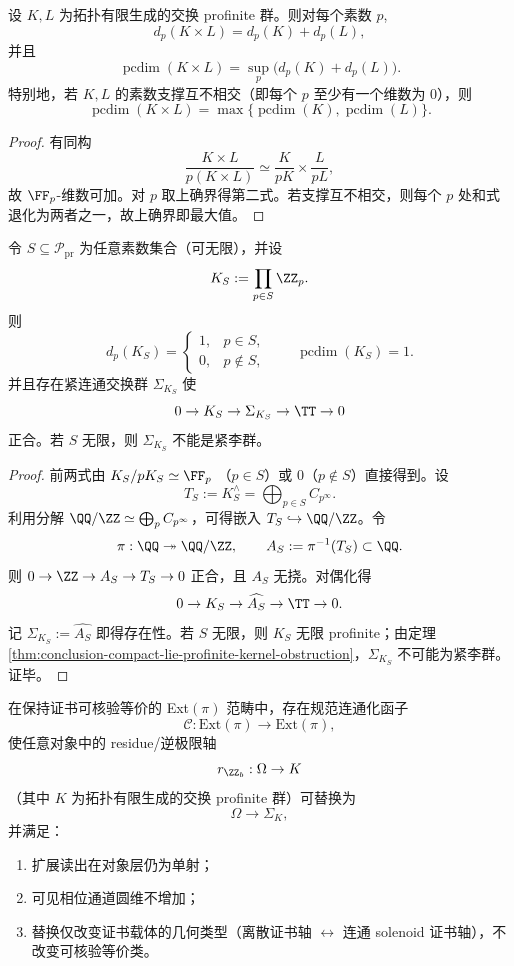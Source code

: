 \begin{proposition}[素数并行的最大值法则与非加性]\label{prop:conclusion-pcdim-max-law}
设 \(K,L\) 为拓扑有限生成的交换 profinite 群。则对每个素数 \(p\),
\[
d_p(K\times L)=d_p(K)+d_p(L),
\]
并且
\[
\operatorname{pcdim}(K\times L)
=
\sup_p\bigl(d_p(K)+d_p(L)\bigr).
\]
特别地，若 \(K,L\) 的素数支撑互不相交（即每个 \(p\) 至少有一个维数为 \(0\)），则
\[
\operatorname{pcdim}(K\times L)=
\max\{\operatorname{pcdim}(K),\operatorname{pcdim}(L)\}.
\]
\end{proposition}
\begin{proof}
有同构
\[
\frac{K\times L}{p(K\times L)}
\simeq
\frac{K}{pK}\times \frac{L}{pL},
\]
故 \(\FF_p\)-维数可加。对 \(p\) 取上确界得第二式。若支撑互不相交，则每个 \(p\) 处和式退化为两者之一，故上确界即最大值。
\end{proof}



\begin{corollary}[无限素数族的一圆维内化]\label{cor:conclusion-infinite-primes-one-circle}
令 \(S\subseteq \mathcal P_{\mathrm{pr}}\) 为任意素数集合（可无限），并设
\[
K_S:=\prod_{p\in S}\ZZ_p.
\]
则
\[
d_p(K_S)=
\begin{cases}
1,&p\in S,\\
0,&p\notin S,
\end{cases}
\qquad
\operatorname{pcdim}(K_S)=1.
\]
并且存在紧连通交换群 \(\Sigma_{K_S}\) 使
\[
0\to K_S\to \Sigma_{K_S}\to \TT\to 0
\]
正合。若 \(S\) 无限，则 \(\Sigma_{K_S}\) 不能是紧李群。
\end{corollary}
\begin{proof}
前两式由
\(
K_S/pK_S\simeq \FF_p
\)
（\(p\in S\)）或 \(0\)（\(p\notin S\)）直接得到。设
\[
T_S:=K_S^\wedge=\bigoplus_{p\in S}C_{p^\infty}.
\]
利用分解 \(\QQ/\ZZ\simeq\bigoplus_p C_{p^\infty}\)，可得嵌入 \(T_S\hookrightarrow \QQ/\ZZ\)。令
\[
\pi:\QQ\twoheadrightarrow \QQ/\ZZ,\qquad
A_S:=\pi^{-1}(T_S)\subset\QQ.
\]
则 \(0\to \ZZ\to A_S\to T_S\to 0\) 正合，且 \(A_S\) 无挠。对偶化得
\[
0\to K_S\to \widehat{A_S}\to \TT\to 0.
\]
记 \(\Sigma_{K_S}:=\widehat{A_S}\) 即得存在性。若 \(S\) 无限，则 \(K_S\) 无限 profinite；由定理 \ref{thm:conclusion-compact-lie-profinite-kernel-obstruction}，\(\Sigma_{K_S}\) 不可能为紧李群。证毕。
\end{proof}

\begin{conjecture}\label{conj:conclusion-extpi-connectedization-no-cdim-increase}
在保持证书可核验等价的 Ext\((\pi)\) 范畴中，存在规范连通化函子
\[
\mathcal C:\mathrm{Ext}(\pi)\to \mathrm{Ext}(\pi),
\]
使任意对象中的 residue/逆极限轴
\[
r_{\ZZ_b}:\Omega\to K
\]
（其中 \(K\) 为拓扑有限生成的交换 profinite 群）可替换为
\[
\Omega\to \Sigma_K,
\]
并满足：
\begin{enumerate}
  \item 扩展读出在对象层仍为单射；
  \item 可见相位通道圆维不增加；
  \item 替换仅改变证书载体的几何类型（离散证书轴 \(\leftrightarrow\) 连通 solenoid 证书轴），不改变可核验等价类。
\end{enumerate}
\end{conjecture}
